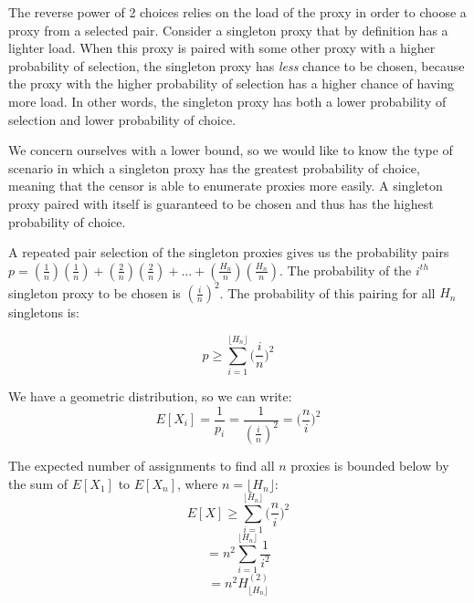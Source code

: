 The reverse power of 2 choices relies on the load of the proxy in order to choose a proxy from a selected pair. Consider a singleton proxy that by definition has a lighter load. When this proxy is paired with some other proxy with a higher probability of selection, the singleton proxy has \textit{less} chance to be chosen, because the proxy with the higher probability of selection has a higher chance of having more load. In other words, the singleton proxy has both a lower probability of selection and lower probability of choice. 

We concern ourselves with a lower bound, so we would like to know the type of scenario in which a singleton proxy has the greatest probability of choice, meaning that the censor is able to enumerate proxies more easily. A singleton proxy paired with itself is guaranteed to be chosen and thus has the highest probability of choice. 


A repeated pair selection of the singleton proxies gives us the probability pairs $p=(\frac{1}{n})(\frac{1}{n}) + (\frac{2}{n})(\frac{2}{n}) + ... + (\frac{H_n}{n})(\frac{H_n}{n})$. The probability of the $i^{th}$ singleton proxy to be chosen is $(\frac{i}{n})^2$. The probability of this pairing for all $H_n$ singletons is:

$$p \geq \sum_{i=1}^{\lfloor{H_n}\rfloor} \bigg(\frac{i}{n}\bigg)^2$$

We have a geometric distribution, so we can write: $$E[X_i] = \frac{1}{p_i} = \frac{1}{(\frac{i}{n})^2} = \bigg(\frac{n}{i}\bigg)^2$$

The expected number of assignments to find all $n$ proxies is bounded below by the sum of $E[X_1]$ to $E[X_n]$, where $n=\lfloor{H_n}\rfloor$:\\

$$E[X] \geq \sum_{i=1}^{\lfloor{H_n}\rfloor} \bigg(\frac{n}{i}\bigg)^2$$
$$= n^2 \sum_{i=1}^{\lfloor{H_n}\rfloor} \frac{1}{i^2}$$
$$= n^2H^{(2)}_{\lfloor{H_n}\rfloor}$$\\



